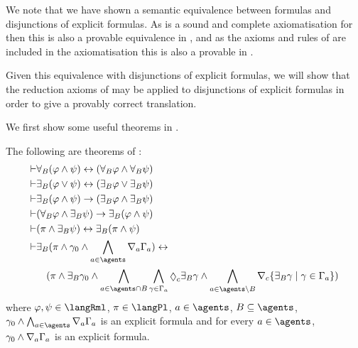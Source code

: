We note that we have shown a semantic equivalence between \langMl{} formulas and disjunctions of explicit formulas.
As \axiomS{} is a sound and complete axiomatisation for \logicS{} then this is also a provable equivalence in \axiomS{}, and as the axioms and rules of \axiomS{} are included in the axiomatisation \axiomRmlS{} this is also a provable in \axiomRmlS{}.

Given this equivalence with disjunctions of explicit formulas, we will show that the reduction axioms of \axiomRmlS{} may be applied to disjunctions of explicit formulas in order to give a provably correct translation.

We first show some useful theorems in \axiomRmlS{}.

\begin{lemma}\label{rml-s5-theorems}
The following are theorems of \axiomRmlKFF{}:
\begin{align}
    \proves & \allrefsBs (\phi \land \psi) \iff (\allrefsBs \phi \land \allrefsBs \psi) \label{rml-s5-and}\\
    \proves & \somerefsBs (\phi \lor \psi) \iff (\somerefsBs \phi \lor \somerefsBs \psi) \label{rml-s5-or}\\
    \proves & \somerefsBs (\phi \land \psi) \implies (\somerefsBs \phi \land \somerefsBs \psi) \label{rml-s5-d-and}\\
    \proves & (\allrefsBs \phi \land \somerefsBs \psi) \implies \somerefsBs (\phi \land \psi) \label{rml-s5-db-and}\\
    \proves & (\pi \land \somerefsBs \psi) \iff \somerefsBs (\pi \land \psi) \label{rml-s5-pd-and}\\
    \proves & \displaystyle \somerefsBs (\pi \land \gamma_0 \land \bigwedge_{\agentA \in \agents} \coverA \Gamma_\agentA) \iff \nonumber\\
            & \displaystyle \quad
            (
            \pi \land
            \somerefsBs \gamma_0 \land
            \bigwedge_{\agentA \in \agents \cap \agentsB} \bigwedge_{\gamma \in \Gamma_\agentA} \possibleC \somerefsBs \gamma \land
            \bigwedge_{\agentA \in \agents \setminus \agentsB} \coversC \{\somerefsBs \gamma \mid \gamma \in \Gamma_\agentA\} 
            ) \label{rml-s5-cover}
\end{align}
where $\phi, \psi \in \langRml$, $\pi \in \langPl$, $\agentA \in \agents$, $\agentsB \subseteq \agents$, $\gamma_0 \land \bigwedge_{\agentA \in \agents} \coversA \Gamma_\agentA$ is an explicit formula and for every $\agentA \in \agents$, $\gamma_0 \land \nabla_{a} \Gamma_a$ is an explicit formula.
\end{lemma}

